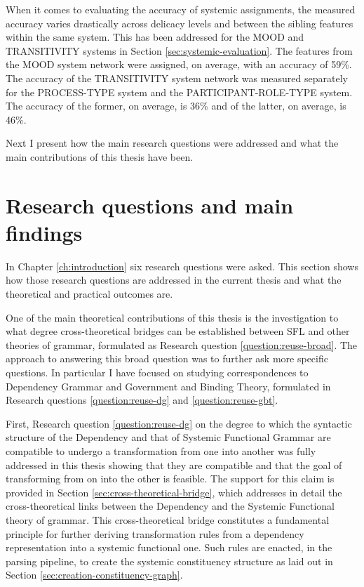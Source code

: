     When it comes to evaluating the accuracy of systemic assignments, the measured accuracy varies drastically across delicacy levels and between the sibling features within the same system. This has been addressed for the MOOD and TRANSITIVITY systems in Section \ref{sec:systemic-evaluation}. The features from the MOOD system network were assigned, on average, with an accuracy of 59\%. The accuracy of the TRANSITIVITY system network was measured separately for the PROCESS-TYPE system and the PARTICIPANT-ROLE-TYPE system. The accuracy of the former, on average, is 36\% and of the latter, on average, is 46\%. 

    Next I present how the main research questions were addressed and what the main contributions of this thesis have been.
    

\section{Research questions and main findings}
    In Chapter \ref{ch:introduction} six research questions were asked. This section shows how those research questions are addressed in the current thesis and what the theoretical and practical outcomes are.
    
    One of the main theoretical contributions of this thesis is the investigation to what degree cross-theoretical bridges can be established between SFL and other theories of grammar, formulated as Research question \ref{question:reuse-broad}. 
    The approach to answering this broad question was to further ask more specific questions. In particular I have focused on studying correspondences to Dependency Grammar and Government and Binding Theory, formulated in Research questions \ref{question:reuse-dg} and \ref{question:reuse-gbt}. 

    First, Research question \ref{question:reuse-dg} on the degree to which the syntactic structure of the Dependency and that of Systemic Functional Grammar are compatible to undergo a transformation from one into another was fully addressed in this thesis showing that they are compatible and that the goal of transforming from on into the other is feasible. The support for this claim is provided in Section \ref{sec:cross-theoretical-bridge}, which addresses in detail the cross-theoretical links between the Dependency and the Systemic Functional theory of grammar. This cross-theoretical bridge constitutes a fundamental principle for further deriving transformation rules from a dependency representation into a systemic functional one. Such rules are enacted, in the parsing pipeline, to create the systemic constituency structure as laid out in Section \ref{sec:creation-constituency-graph}. 
    
